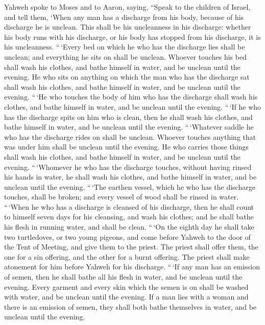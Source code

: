  Yahweh spoke to Moses and to Aaron, saying,
 ``Speak to the children of Israel, and tell them, `When
any man has a discharge from his body, because of his discharge he is
unclean.  This shall be his uncleanness in his discharge:
whether his body runs with his discharge, or his body has stopped from
his discharge, it is his uncleanness.  ``\,`Every bed on
which he who has the discharge lies shall be unclean; and everything he
sits on shall be unclean.  Whoever touches his bed shall
wash his clothes, and bathe himself in water, and be unclean until the
evening.  He who sits on anything on which the man who has
the discharge sat shall wash his clothes, and bathe himself in water,
and be unclean until the evening.  ``\,`He who touches the
body of him who has the discharge shall wash his clothes, and bathe
himself in water, and be unclean until the evening. 
``\,`If he who has the discharge spits on him who is clean, then he
shall wash his clothes, and bathe himself in water, and be unclean until
the evening.  ``\,`Whatever saddle he who has the
discharge rides on shall be unclean.  Whoever touches
anything that was under him shall be unclean until the evening. He who
carries those things shall wash his clothes, and bathe himself in water,
and be unclean until the evening.  ``\,`Whomever he who
has the discharge touches, without having rinsed his hands in water, he
shall wash his clothes, and bathe himself in water, and be unclean until
the evening.  ``\,`The earthen vessel, which he who has
the discharge touches, shall be broken; and every vessel of wood shall
be rinsed in water.  ``\,`When he who has a discharge is
cleansed of his discharge, then he shall count to himself seven days for
his cleansing, and wash his clothes; and he shall bathe his flesh in
running water, and shall be clean.  ``\,`On the eighth
day he shall take two turtledoves, or two young pigeons, and come before
Yahweh to the door of the Tent of Meeting, and give them to the priest.
 The priest shall offer them, the one for a sin offering,
and the other for a burnt offering. The priest shall make atonement for
him before Yahweh for his discharge.  ``\,`If any man has
an emission of semen, then he shall bathe all his flesh in water, and be
unclean until the evening.  Every garment and every skin
which the semen is on shall be washed with water, and be unclean until
the evening.  If a man lies with a woman and there is an
emission of semen, they shall both bathe themselves in water, and be
unclean until the evening.

